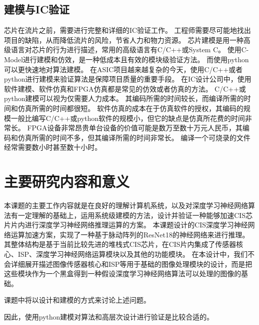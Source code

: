 \subsection{建模与IC验证}
芯片在流片之前，需要进行完整和详细的IC验证工作。
工程师需要尽可能地找出项目的缺陷，从而降低流片的风险，节省人力和物力资源。
芯片建模是用一种高级语言对芯片的行为进行描述，常用的高级语言有C/C++或System C。
使用C-Model进行建模和仿效，是一种低成本且有效的模块级验证方法。
而使用python可以更快速地对算法建模。
在ASIC项目越来越复杂的今天，使用C/C++或者python进行建模来验证算法是保障项目质量的重要手段。
在IC设计公司中，使用软件建模、软件仿真和FPGA仿真都是常见的仿效或者仿真的方法。
C/C++或python建模可以视为仅需要人力成本。
其编码所需的时间较长，而编译所需的时间和仿真所需的时间都很短。
软件仿真的成本在于仿真软件的授权，其编码的规模一般比编写C/C++或python软件的规模小，但它的缺点是仿真所花费的时间非常长。
FPGA设备非常昂贵单台设备的价值可能是数万至数十万元人民币，其编码和仿真所需的时间不多，但其编译所需的时间非常长。
编译一个可烧录的文件经常需要数小时甚至数十小时。


\section{主要研究内容和意义}

本课题的主要工作内容就是在良好的理解计算机系统，以及对深度学习神经网络算法有一定理解的基础上，运用系统级建模的方法，设计并验证一种能够加速CIS芯片片内进行深度学习神经网络推理运算的方案。  
本课题设计的CIS深度学习神经网络运算加速方案，实现了一种基于脉动阵列的ResNet18的神经网络来进行推理。
其整体结构是基于当前比较先进的堆栈式CIS芯片，在CIS片内集成了传感器核心、ISP、深度学习神经网络运算模块以及其他的功能模块。
在本设计中，我们不会详细展开描述图像传感器核心和ISP等用于基础的图像处理模块的设计，而是把这些模块作为一个黑盒得到一种假设深度学习神经网络算法可以处理的图像的基础。  

课题中将以设计和建模的方式来讨论上述问题。

因此，使用python建模对算法和高层次设计进行验证是比较合适的。
